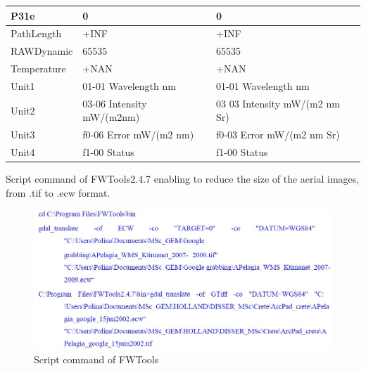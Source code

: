 \documentclass[10pt, a4paper]{article}
\begin{document}
\begin{appendices}
\begin{table}[H]
\begin{tabular}{| p{3cm} | p{3cm} | p{5cm} |}
	   P31e & 0 & 0 \\ \hline
	   PathLength & +INF & +INF \\ \hline
	   RAWDynamic & 65535 & 65535 \\ \hline
	   Temperature & +NAN & +NAN \\ \hline
	   Unit1 & 01-01 Wavelength nm &  01-01 Wavelength nm \\ \hline
	   Unit2 & 03-06 Intensity mW/(m2nm) & 03 03 Intensity mW/(m2 nm Sr) \\ \hline
	   Unit3 & f0-06 Error mW/(m2 nm) & f0-03 Error mW/(m2 nm Sr) \\ \hline
	  Unit4 & f1-00 Status & f1-00 Status \\ \hline
	\end{tabular}
	\label{tab:33}
\end{table}
\pagebreak

Script command of FWTools2.4.7 enabling to reduce the size of the aerial images, from .tif to .ecw
format.
\begin{figure}[h]
	\begin{center}
		\includegraphics[scale=0.4]{Script_Gdal.jpg}
		\caption{Script command of FWTools}
	\end{center}
	\label{fig:69}
\end{figure}
\pagebreak
\newpage


\end{appendices}
\end{document}
